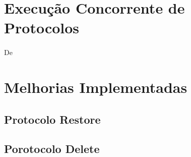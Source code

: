 \documentclass[11pt,oneside]{book}
\begin{document}
\section{Execução Concorrente de Protocolos}
\paragraph{}
De

\section{Melhorias Implementadas}
\subsection{Protocolo Restore}
\subsection{Porotocolo Delete}



 
 



\begin{appendices}

\end{appendices}
\end{document}

